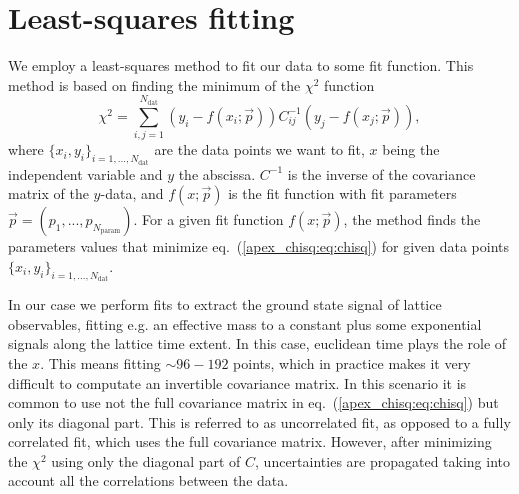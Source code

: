 
\chapter{Least-squares fitting}
\label{apex_chisq}

We employ a least-squares method to fit our data to some fit function. This method is based on finding the  minimum of the $\chi^2$ function
\begin{equation}
\label{apex_chisq:eq:chisq}
\chi^2=\sum_{i,j=1}^{N_{\textrm{dat}}}\left(y_i-f(x_i;\vec{p})\right)C_{ij}^{-1}\left(y_j-f(x_j;\vec{p})\right),
\end{equation}
where $\{x_i,y_i\}_{i=1,...,N_{\textrm{dat}}}$ are the data points we want to fit, $x$ being the independent variable and $y$ the abscissa. $C^{-1}$ is the inverse of the covariance matrix of the $y$-data, and $f(x;\vec{p})$ is the fit function with fit parameters $\vec{p}=(p_1,...,p_{N_{\textrm{param}}})$. For a given fit function $f(x;\vec{p})$, the method finds the parameters values that minimize eq.~(\ref{apex_chisq:eq:chisq}) for given data points $\{x_i,y_i\}_{i=1,...,N_{\textrm{dat}}}$.

In our case we perform fits to extract the ground state signal of lattice observables, fitting e.g. an effective mass to a constant plus some exponential signals along the lattice time extent. In this case, euclidean time plays the role of the $x$. This means fitting $\sim96-192$ points, which in practice makes it very difficult to computate an invertible covariance matrix. In this scenario it is common to use not the full covariance matrix in eq.~(\ref{apex_chisq:eq:chisq}) but only its diagonal part. This is referred to as uncorrelated fit, as opposed to a fully correlated fit, which uses the full covariance matrix. However, after minimizing the $\chi^2$ using only the diagonal part of $C$, uncertainties are propagated taking into account all the correlations between the data.

